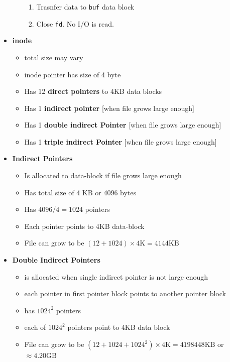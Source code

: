 \documentclass[12pt]{article}
\begin{document}
\begin{itemize}
\begin{itemize}
\begin{enumerate}[1.]
            \item Trasnfer data to \texttt{buf} data block

            \item Close \texttt{fd}. No I/O is read.
        \end{enumerate}
    \end{itemize}

    \item \textbf{inode}

    \begin{itemize}
        \item total size may vary
        \item inode pointer has size of 4 byte
        \item Has 12 \textbf{direct pointers} to 4KB data blocks
        \item Has 1 \textbf{indirect pointer} [when file grows large enough]
        \item Has 1 \textbf{double indirect Pointer} [when file grows large enough]
        \item Has 1 \textbf{triple indirect Pointer} [when file grows large enough]
    \end{itemize}

    \item \textbf{Indirect Pointers}

    \begin{itemize}
        \item Is allocated to data-block if file grows large enough
        \item Has total size of 4 KB or 4096 bytes
        \item Has $4096/4 = 1024$ pointers
        \item Each pointer points to 4KB data-block
        \item File can grow to be $(12 + 1024) \times 4\text{K} = 4144\text{KB}$
    \end{itemize}

    \item \textbf{Double Indirect Pointers}

    \begin{itemize}
        \item is allocated when single indirect pointer is not large enough
        \item each pointer in first pointer block points to another pointer block
        \item has $1024^2$ pointers
        \item each of $1024^2$ pointers point to 4KB data block
        \item File can grow to be $(12 + 1024 + 1024^2) \times 4\text{K} = 4198448\text{KB}$ or $\approx 4.20 \text{GB}$


\end{itemize}
\end{itemize}
\end{document}
